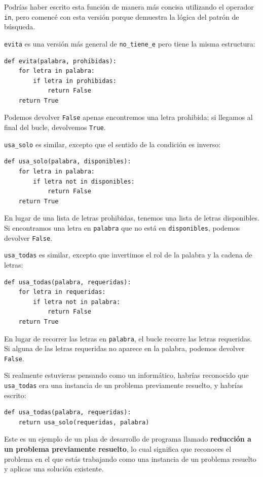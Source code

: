 \documentclass[10pt]{book}
\begin{document}
Podrías haber escrito esta función de manera más concisa utilizando el operador {\tt in},
pero comencé con esta versión porque
demuestra la lógica del patrón de búsqueda.

{\tt evita} es una versión más general de \verb"no_tiene_e" pero
tiene la misma estructura:

\begin{verbatim}
def evita(palabra, prohibidas):
    for letra in palabra:
        if letra in prohibidas:
            return False
    return True
\end{verbatim}
%
Podemos devolver {\tt False} apenas encontremos una letra prohibida;
si llegamos al final del bucle, devolvemos {\tt True}.

\verb"usa_solo" es similar, excepto que el sentido de la condición
es inverso:

\begin{verbatim}
def usa_solo(palabra, disponibles):
    for letra in palabra:
        if letra not in disponibles:
            return False
    return True
\end{verbatim}
%
En lugar de una lista de letras prohibidas, tenemos una lista de letras
disponibles.  Si encontramos una letra en {\tt palabra} que no está en
{\tt disponibles}, podemos devolver {\tt False}.

\verb"usa_todas" es similar, excepto que invertimos el rol
de la palabra y la cadena de letras:

\begin{verbatim}
def usa_todas(palabra, requeridas):
    for letra in requeridas:
        if letra not in palabra:
            return False
    return True
\end{verbatim}
%
En lugar de recorrer las letras en {\tt palabra}, el bucle
recorre las letras requeridas.  Si alguna de las letras requeridas
no aparece en la palabra, podemos devolver {\tt False}.

Si realmente estuvieras pensando como un informático,
habrías reconocido que \verb"usa_todas" era una instancia de un
problema previamente resuelto, y habrías escrito:

\begin{verbatim}
def usa_todas(palabra, requeridas):
    return usa_solo(requeridas, palabra)
\end{verbatim}
%
Este es un ejemplo de un plan de desarrollo de programa llamado {\bf
  reducción a un problema previamente resuelto}, lo cual significa que
reconoces el problema en el que estás trabajando como una instancia de un
problema resuelto y aplicas una solución existente.   
\end{document}
